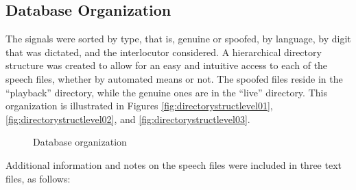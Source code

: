 \subsection{Database Organization}
\par The signals were sorted by type, that is, genuine or spoofed, by language, by digit that was dictated, and the interlocutor considered. A hierarchical directory structure was created to allow for an easy and intuitive access to each of the speech files, whether by automated means or not. The spoofed files reside in the ``playback'' directory, while the genuine ones are in the ``live'' directory. This organization is illustrated in Figures \ref{fig:directorystructlevel01}, \ref{fig:directorystructlevel02}, and \ref{fig:directorystructlevel03}.
\begin{figure}[ht]
\centering
{}
\caption{Database organization}
\label{fig:directorystructlevel010203}
\end{figure}
\par Additional information and notes on the speech files were included in three text files, as follows:
